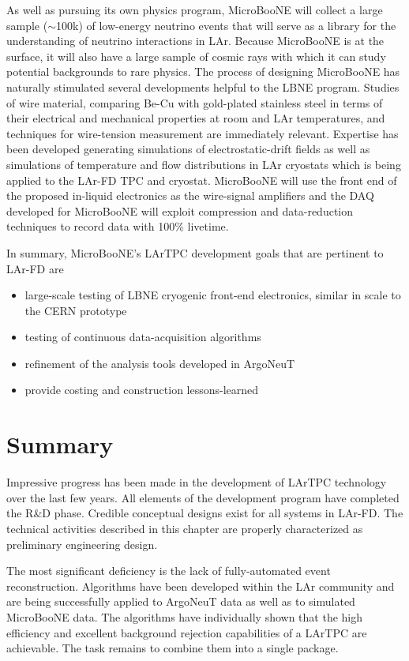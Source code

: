 As well as pursuing its own physics program, MicroBooNE will collect a large sample ($\sim$100k) of low-energy neutrino events that will serve as a library for the understanding of neutrino interactions in 
LAr. Because MicroBooNE is at the surface, it will also have a large sample of cosmic rays with which it can study potential backgrounds to rare physics. The process of designing MicroBooNE has naturally stimulated several developments helpful to the LBNE program.  Studies of wire material, comparing Be-Cu with gold-plated stainless steel in terms of their electrical and mechanical properties at room and LAr temperatures, and techniques for wire-tension measurement are immediately relevant. Expertise has been developed generating simulations of electrostatic-drift fields as well as simulations of temperature and flow distributions in LAr cryostats which is being applied to the LAr-FD TPC and cryostat. MicroBooNE will use the front end of the proposed in-liquid electronics as the wire-signal amplifiers and the DAQ developed for MicroBooNE will exploit compression and data-reduction techniques to record data with 100\% livetime.

\noindent  In summary, MicroBooNE's LArTPC development goals that are pertinent to LAr-FD are
\begin{itemize}
\item large-scale testing of LBNE cryogenic front-end electronics, similar in scale to the CERN prototype
\item testing of continuous data-acquisition algorithms
\item refinement of the analysis tools developed in ArgoNeuT
\item provide costing and construction lessons-learned
\end{itemize}

\section{Summary}

Impressive progress has been made in the development of LArTPC technology over the last few years. All elements of the development program have completed the R\&D phase. Credible conceptual designs exist for all systems in LAr-FD. The technical activities described in this chapter are properly characterized as preliminary engineering design.

The most significant deficiency is the lack of fully-automated event reconstruction. Algorithms have been developed within the LAr community and are being successfully applied to ArgoNeuT data as well as to simulated MicroBooNE data. The algorithms have individually shown that the high efficiency and excellent background rejection capabilities of a LArTPC are achievable. The task remains to combine them into a single package. 


